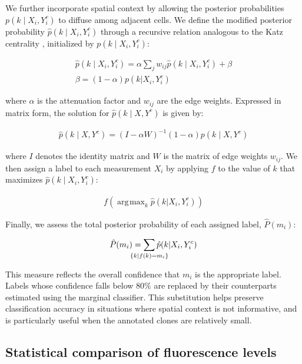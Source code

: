 \documentclass[10pt,letterpaper]{article}
\DeclareMathOperator*{\argmax}{\arg\!\max} %
\begin{document}
We further incorporate spatial context by allowing the posterior probabilities $p(k \mid X_i,Y_i^c)$ to diffuse among adjacent cells. We define the modified posterior probability $\hat{p}(k \mid X_i,Y_i^c)$ through a recursive relation analogous to the Katz centrality \cite{Katz1953}, initialized by $p(k \mid X_i,Y_i^c)$:
\begin{linenomath} \begin{gather}
\hat{p}(k \mid X_i, Y^c_i) = \alpha \sum_{j}{w_{ij} \hat{p}(k \mid X_i, Y^c _i)} + \beta\\
\beta = (1-\alpha) p(k| X_i,Y^c_i)
\end{gather} \end{linenomath}
where $\alpha$ is the attenuation factor and $w_{ij}$ are the edge weights. Expressed in matrix form, the solution for $\hat{p}(k \mid X,Y^c)$ is given by:
\begin{linenomath} \begin{gather}
\hat{p}(k \mid X,Y^c) = ( I - \alpha W )^{-1} (1-\alpha)p(k \mid X, Y^c)
\end{gather} \end{linenomath}
where $I$ denotes the identity matrix and $W$ is the matrix of edge weights $w_{ij}$. We then assign a label to each measurement $X_i$ by applying $f$ to the value of $k$ that maximizes $\hat{p}(k \mid X_i,Y_i^c)$:
\begin{linenomath} \begin{gather}
f(\argmax_{k} \hat{p}(k | X_i, Y^c_i))
\end{gather} \end{linenomath}

Finally, we assess the total posterior probability of each assigned label, $\hat{P}(m_i)$:
\begin{linenomath} \begin{gather}
\hat{P}(m_i) = \sum_{ \mathclap{ \{ k | f(k)=m_i \}} } \hat{p}(k | X_i,Y^c_i)
\end{gather} \end{linenomath}
This measure reflects the overall confidence that $m_i$ is the appropriate label. Labels whose confidence falls below 80\% are replaced by their counterparts estimated using the marginal classifier. This substitution helps preserve classification accuracy in situations where spatial context is not informative, and is particularly useful when the annotated clones are relatively small.

\subsection*{Statistical comparison of fluorescence levels}
\end{document}
